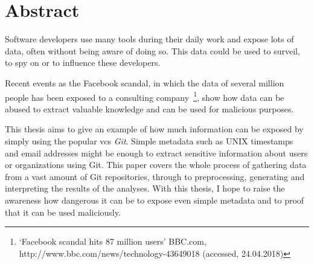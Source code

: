 \chapter*{Abstract}

Software developers use many tools during their daily work and expose lots of data, often without being aware of doing so.
This data could be used to surveil, to spy on or to influence these developers.

Recent events as the Facebook scandal, in which the data of several million people has been exposed to a consulting company~\footnote{`Facebook scandal hits 87 million users' BBC.com, http://www.bbc.com/news/technology-43649018 (accessed, 24.04.2018)}, show how data can be abused to extract valuable knowledge and can be used for malicious purposes.

This thesis aims to give an example of how much information can be exposed by simply using the popular \ac{vcs} \emph{Git}.
Simple metadata such as UNIX timestamps and email addresses might be enough to extract sensitive information about users or organizations using Git.
This paper covers the whole process of gathering data from a vast amount of Git repositories, through to preprocessing, generating and interpreting the results of the analyses.
With this thesis, I hope to raise the awareness how dangerous it can be to expose even simple metadata and to proof that it can be used maliciously.
